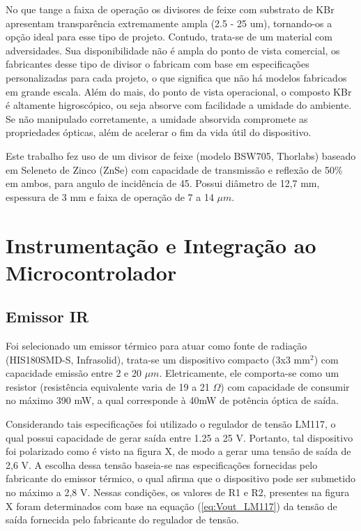 \documentclass[oneside,openright,12pt]{ufsm_2021} %
\begin{document}
            \par No que tange a faixa de operação os divisores de feixe com substrato de KBr apresentam transparência extremamente ampla (2.5 - 25 um), tornando-os a opção ideal para esse tipo de projeto. Contudo, trata-se de um material com adversidades. Sua disponibilidade não é ampla do ponto de vista comercial, os fabricantes desse tipo de divisor o fabricam com base em especificações personalizadas para cada projeto, o que significa que não há modelos fabricados em grande escala. Além do mais, do ponto de vista operacional, o composto KBr é altamente higroscópico, ou seja absorve com facilidade a umidade do ambiente. Se não manipulado corretamente, a umidade absorvida compromete as propriedades ópticas, além de acelerar o fim da vida útil do dispositivo.

            \par Este trabalho fez uso de um divisor de feixe (modelo BSW705, Thorlabs) baseado em Seleneto de Zinco (ZnSe) com capacidade de transmissão e reflexão de 50\% em ambos, para angulo de incidência de 45. Possui diâmetro de 12,7 mm, espessura de 3 mm e faixa de operação de 7 a 14 $\mu m$.
            
    \section{Instrumentação e Integração ao Microcontrolador}
        \subsection{Emissor IR}
            \par Foi selecionado um emissor térmico para atuar como fonte de radiação (HIS180SMD-S, Infrasolid), trata-se um dispositivo compacto (3x3 mm$^2$) com capacidade emissão entre 2 e 20 $\mu m$. Eletricamente, ele comporta-se como um resistor (resistência equivalente varia de 19 a 21 $\Omega$) com capacidade de consumir no máximo 390 mW, a qual corresponde à 40mW de potência óptica de saída.
            \par Considerando tais especificações foi utilizado o regulador de tensão LM117, o qual possui capacidade de gerar saída entre 1.25 a 25 V. Portanto, tal dispositivo foi polarizado como é visto na figura X, de modo a gerar uma tensão de saída de 2,6 V. A escolha dessa tensão baseia-se nas especificações fornecidas pelo fabricante do emissor térmico, o qual afirma que o dispositivo pode ser submetido no máximo a 2,8 V. Nessas condições, os valores de R1 e R2, presentes na figura X foram determinados com base na equação (\ref{eq:Vout_LM117}) da tensão de saída fornecida pelo fabricante do regulador de tensão.
\end{document}
